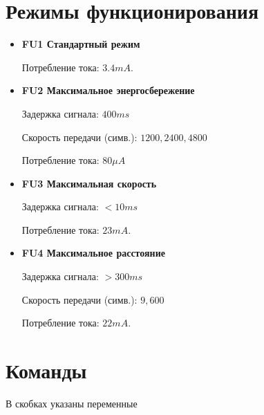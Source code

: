 \documentclass[12pt]{article}
\begin{document}
\section{Режимы функционирования}

\begin{itemize}

\item \textbf{FU1 Стандартный режим }
   
Потребление тока: $3.4mA$.

\item \textbf{FU2 Максимальное энергосбережение}

Задержка сигнала: $400ms$
  
Скорость передачи (симв.): $1200, 2400, 4800$
 
Потребление тока: $80\mu A$

\item \textbf{FU3 Максимальная скорость}

Задержка сигнала: $< 10 ms$ 

Потребление тока: $23 mA$.

\item \textbf{FU4 Максимальное расстояние}

Задержка сигнала: $>300ms$ 

Скорость передачи (симв.): $9,600$ 

Потребление тока: $22mA$.

\end{itemize}


\section{Команды}


В скобках указаны переменные
\end{document}
